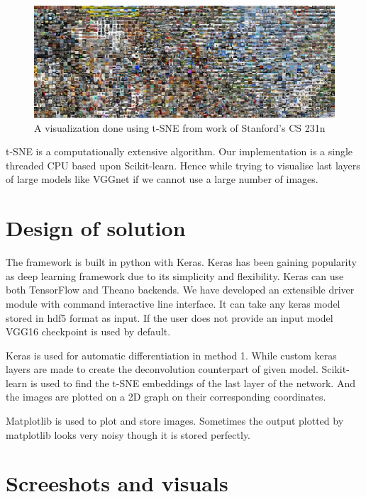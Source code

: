 \documentclass{article} %
\begin{document}
\begin{figure}[h]
  \begin{center}
  \includegraphics[width=\linewidth]{tsne.jpeg}
  \end{center}
  \caption{A visualization done using t-SNE from work of Stanford's CS 231n}
\end{figure}

t-SNE is a computationally extensive algorithm. Our implementation is a single
threaded CPU based upon Scikit-learn. Hence while trying to visualise last layers
of large models like VGGnet if we cannot use a large number of images.

\section{Design of solution}

The framework is built in python with Keras. Keras has been gaining popularity
as deep learning framework due to its simplicity and flexibility. Keras can use
both TensorFlow and Theano backends. We have developed an extensible driver
module with command interactive line interface. It can take any keras model
stored in hdf5 format as input. If the user does not provide an input model VGG16
checkpoint is used by default.

Keras is used for automatic differentiation in method 1. While custom keras layers
are made to create the deconvolution counterpart of given model.
Scikit-learn is used to find the t-SNE embeddings of the last layer of the network.
And the images are plotted on a 2D graph on their corresponding coordinates.

Matplotlib is used to plot and store images. Sometimes the output plotted by
matplotlib looks very noisy though it is stored perfectly.

\section{Screeshots and visuals}
\end{document}
